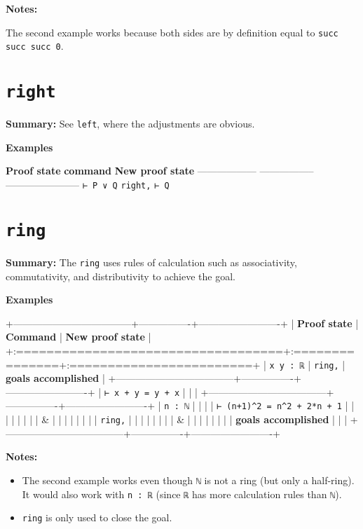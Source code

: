 \documentclass{memoir}
\begin{document}
\textbf{Notes:}

The second example works because both sides are by definition equal to \Verb|succ succ succ 0|.




\section{\Verb|right|}

\textbf{Summary:} See \Verb|left|, where the adjustments are obvious.

\textbf{Examples}

\textbf{Proof state} \textbf{command} \textbf{New proof state}
------------------ ----------------- -----------------------
\Verb|⊢ P ∨ Q| \Verb|right,| \Verb|⊢ Q|




\section{\Verb|ring|}

\textbf{Summary:} The \Verb|ring| uses rules of calculation such as associativity, commutativity, and distributivity to achieve the goal.

\textbf{Examples}

+------------------------------------+----------------+-------------------------+
| \textbf{Proof state} | \textbf{Command} | \textbf{New proof state} |
+:===================================+:===============+:========================+
| \Verb|x y : ℝ| | \Verb|ring,| | \textbf{goals accomplished} |
+------------------------------------+----------------+-------------------------+
| \Verb|⊢ x + y = y + x| | | |
+------------------------------------+----------------+-------------------------+
| \Verb|n : ℕ| | | |
| \Verb|⊢ (n+1)^2 = n^2 + 2*n + 1| | | |
| | | |
| & | | |
| | | |
| \Verb|ring,| | | |
| | | |
| & | | |
| | | |
| \textbf{goals accomplished} | | |
+------------------------------------+----------------+-------------------------+

\textbf{Notes:}

\begin{itemize}
\item The second example works even though \Verb|ℕ| is not a ring (but only a half-ring). It would also work with \Verb|n : ℝ| (since \Verb|ℝ| has more calculation rules than \Verb|ℕ|).\item \Verb|ring| is only used to close the goal.

\end{itemize}
\end{document}
